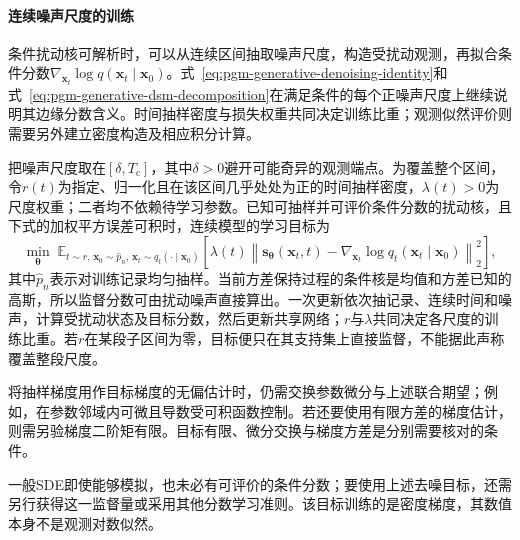 \paragraph{连续噪声尺度的训练}

条件扰动核可解析时，可以从连续区间抽取噪声尺度，构造受扰动观测，再拟合条件分数$\nabla_{\bm{x}_t}\log q(\bm{x}_t\mid\bm{x}_0)$。式~\eqref{eq:pgm-generative-denoising-identity}和式~\eqref{eq:pgm-generative-dsm-decomposition}在满足条件的每个正噪声尺度上继续说明其边缘分数含义。时间抽样密度与损失权重共同决定训练比重；观测似然评价则需要另外建立密度构造及相应积分计算。

把噪声尺度取在$[\delta,T_{\mathrm c}]$，其中$\delta>0$避开可能奇异的观测端点。为覆盖整个区间，令$r(t)$为指定、归一化且在该区间几乎处处为正的时间抽样密度，$\lambda(t)>0$为尺度权重；二者均不依赖待学习参数。已知可抽样并可评价条件分数的扰动核，且下式的加权平方误差可积时，连续模型的学习目标为
\begin{equation}
  \label{eq:pgm-generative-continuous-dsm-objective}
  \min_{\bm\theta}\;\mathbb E_{
       t\sim r,\,\bm x_0\sim\widehat p_n,\,
       \bm x_t\sim q_t(\cdot\mid\bm x_0)}
    \left[\lambda(t)\left\|
      \bm s_{\bm\theta}(\bm x_t,t)
       -\nabla_{\bm x_t}\log q_t(\bm x_t\mid\bm x_0)
                      \right\|_2^2\right],
\end{equation}
其中$\widehat p_n$表示对训练记录均匀抽样。当前方差保持过程的条件核是均值和方差已知的高斯，所以监督分数可由扰动噪声直接算出。一次更新依次抽记录、连续时间和噪声，计算受扰动状态及目标分数，然后更新共享网络；$r$与$\lambda$共同决定各尺度的训练比重。若$r$在某段子区间为零，目标便只在其支持集上直接监督，不能据此声称覆盖整段尺度。

将抽样梯度用作目标梯度的无偏估计时，仍需交换参数微分与上述联合期望；例如，在参数邻域内可微且导数受可积函数控制。若还要使用有限方差的梯度估计，则需另验梯度二阶矩有限。目标有限、微分交换与梯度方差是分别需要核对的条件。

一般SDE即使能够模拟，也未必有可评价的条件分数；要使用上述去噪目标，还需另行获得这一监督量或采用其他分数学习准则。该目标训练的是密度梯度，其数值本身不是观测对数似然。


